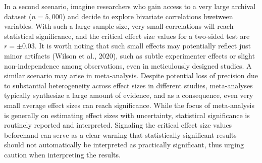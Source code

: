 \documentclass[
  man]{apa7}
\begin{document}
In a second scenario, imagine researchers who gain access to a very large archival dataset (\(n = 5,000\)) and decide to explore bivariate correlations bwetween variables. With such a large sample size, very small correlations will reach statistical significance, and the critical effect size values for a two-sided test are \(r = \pm 0.03\). It is worth noting that such small effects may potentially reflect just minor artifacts (Wilson et al., 2020), such as subtle experimenter effects or slight non-independence among observations, even in meticulously designed studies. A similar scenario may arise in meta-analysis. Despite potential loss of precision due to substantial heterogeneity across effect sizes in different studies, meta-analyses typically synthesize a large amount of evidence, and as a consequence, even very small average effect sizes can reach significance. While the focus of meta-analysis is generally on estimating effect sizes with uncertainty, statistical significance is routinely reported and interpreted. Signaling the critical effect size values beforehand can serve as a clear warning that statistically significant results should not automatically be interpreted as practically significant, thus urging caution when interpreting the results.
\end{document}
